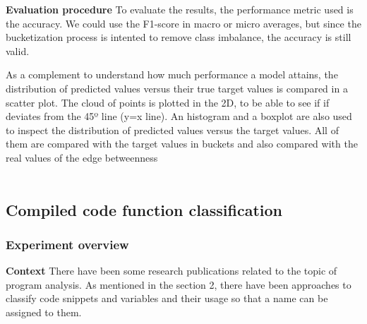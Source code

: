 


\textbf{Evaluation procedure}
To evaluate the results, the performance metric used is the accuracy. We could use the F1-score in macro or micro averages, but since the bucketization process is intented to remove class imbalance, the accuracy is still valid.


As a complement to understand how much performance a model attains, the distribution of predicted values versus their true target values is compared in a scatter plot. The cloud of points is plotted in the 2D, to be able to see if if deviates from the 45º line (y=x line). An histogram and a boxplot are also used to inspect the distribution of predicted values versus the target values. All of them are compared with the target values in buckets and also compared with the real values of the edge betweenness \\
\\




\subsection{Compiled code function classification}

\subsubsection{Experiment overview}

\textbf{Context}
There have been some research publications related to the topic of program analysis. As mentioned in the section 2, there have been approaches to classify code snippets \cite{code2vec} and variables \cite{139} and their usage so that a name can be assigned to them. 

